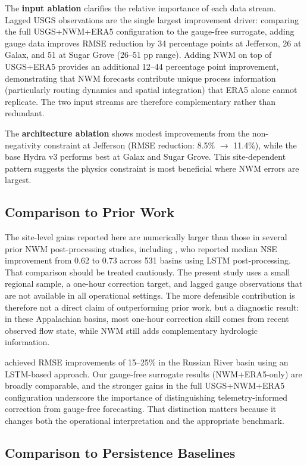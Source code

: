 \documentclass[draft]{agujournal2019}
\begin{document}
The \textbf{input ablation} clarifies the relative importance of each data stream. Lagged USGS observations are the single largest improvement driver: comparing the full USGS+NWM+ERA5 configuration to the gauge-free surrogate, adding gauge data improves RMSE reduction by 34 percentage points at Jefferson, 26 at Galax, and 51 at Sugar Grove (26--51 pp range). Adding NWM on top of USGS+ERA5 provides an additional 12--44 percentage point improvement, demonstrating that NWM forecasts contribute unique process information (particularly routing dynamics and spatial integration) that ERA5 alone cannot replicate. The two input streams are therefore complementary rather than redundant.

The \textbf{architecture ablation} shows modest improvements from the non-negativity constraint at Jefferson (RMSE reduction: 8.5\% $\to$ 11.4\%), while the base Hydra v3 performs best at Galax and Sugar Grove. This site-dependent pattern suggests the physics constraint is most beneficial where NWM errors are largest.

\subsection{Comparison to Prior Work}

The site-level gains reported here are numerically larger than those in several prior NWM post-processing studies, including , who reported median NSE improvement from 0.62 to 0.73 across 531 basins using LSTM post-processing. That comparison should be treated cautiously. The present study uses a small regional sample, a one-hour correction target, and lagged gauge observations that are not available in all operational settings. The more defensible contribution is therefore not a direct claim of outperforming prior work, but a diagnostic result: in these Appalachian basins, most one-hour correction skill comes from recent observed flow state, while NWM still adds complementary hydrologic information.

 achieved RMSE improvements of 15--25\% in the Russian River basin using an LSTM-based approach. Our gauge-free surrogate results (NWM+ERA5-only) are broadly comparable, and the stronger gains in the full USGS+NWM+ERA5 configuration underscore the importance of distinguishing telemetry-informed correction from gauge-free forecasting. That distinction matters because it changes both the operational interpretation and the appropriate benchmark.

\subsection{Comparison to Persistence Baselines}
\end{document}
